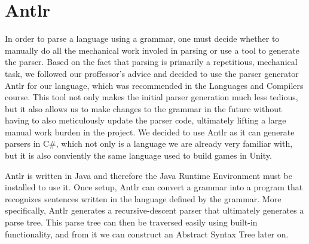 \section{Antlr}
In order to parse a language using a grammar, one must decide whether to manually do all the mechanical work involed in parsing or use a tool to generate the parser.
Based on the fact that parsing is primarily a repetitious, mechanical task, we followed our proffessor's advice and decided to use the parser generator Antlr for our language, which was recommended in the Languages and Compilers course. 
This tool not only makes the initial parser generation much less tedious, but it also allows us to make changes to the grammar in the future without having to also meticulously update the parser code, ultimately lifting a large manual work burden in the project.
We decided to use Antlr as it can generate parsers in C\#, which not only is a language we are already very familiar with, but it is also conviently the same language used to build games in Unity. \

Antlr is written in Java and therefore the Java Runtime Environment must be installed to use it. 
Once setup, Antlr can convert a grammar into a program that recognizes sentences written in the language defined by the grammar.
More specifically, Antlr generates a recursive-descent parser that ultimately generates a parse tree.
This parse tree can then be traversed easily using built-in functionality, and from it we can construct an Abstract Syntax Tree later on.